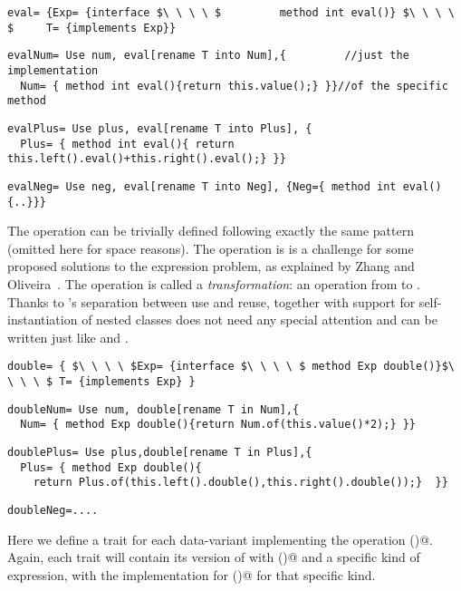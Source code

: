 \begin{lstlisting}
eval= {Exp= {interface $\ \ \ \ $         method int eval()} $\ \ \ \ $     T= {implements Exp}}
\end{lstlisting}
\multiCode
\begin{lstlisting}
evalNum= Use num, eval[rename T into Num],{         //just the implementation
  Num= { method int eval(){return this.value();} }}//of the specific method
\end{lstlisting}
\multiCode
\begin{lstlisting}
evalPlus= Use plus, eval[rename T into Plus], {
  Plus= { method int eval(){ return this.left().eval()+this.right().eval();} }}
\end{lstlisting}
\multiCode
\begin{lstlisting}
evalNeg= Use neg, eval[rename T into Neg], {Neg={ method int eval(){..}}}
\end{lstlisting}

The \Q@show@ operation can be trivially defined
following exactly the same pattern (omitted here for space reasons).
The operation \Q@double@ is is a challenge for some proposed solutions
to the expression problem, as explained by Zhang and Oliveira~\cite{zhang2017evf}.
The \Q@double@ operation is called a \emph{transformation}: an operation from \Q@Exp@ to \Q@Exp@.
Thanks to \name's separation between use and reuse,
together with support
for self-instantiation of nested classes
\Q@double@ does not need any special attention
and can be written just like \Q@eval@ and \Q@show@.
\begin{lstlisting}
double= { $\ \ \ \ $Exp= {interface $\ \ \ \ $ method Exp double()}$\ \ \ \ $ T= {implements Exp} }
\end{lstlisting}
\multiCode
\begin{lstlisting}
doubleNum= Use num, double[rename T in Num],{
  Num= { method Exp double(){return Num.of(this.value()*2);} }}
\end{lstlisting}
\multiCode
\begin{lstlisting}
doublePlus= Use plus,double[rename T in Plus],{
  Plus= { method Exp double(){
    return Plus.of(this.left().double(),this.right().double());}  }}
\end{lstlisting}
\multiCode
\begin{lstlisting}
doubleNeg=....
\end{lstlisting}
Here we define a trait for each data-variant implementing the operation \Q@double()@.
Again, each trait will contain its version of \Q@Exp@ with \Q@double()@
and a specific kind of expression, with the implementation for \Q@double()@
for that specific kind.

